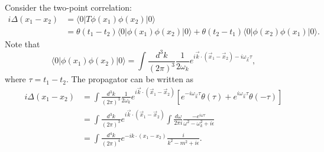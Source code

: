 Consider the two-point correlation:
\begin{equation*}
\begin{aligned}
	i\Delta(x_1-x_2) &= \langle 0|T \phi(x_1) \phi(x_2) |0\rangle \\
	&= \theta(t_1-t_2) \langle 0|\phi(x_1) \phi(x_2) |0\rangle 
	+ \theta(t_2-t_1) \langle 0|\phi(x_2) \phi(x_1) |0\rangle.
\end{aligned}
\end{equation*}
Note that
\begin{equation*}
	\langle 0|\phi(x_1) \phi(x_2) |0\rangle
	= \int\frac{d^{3} k}{(2\pi)^{3}}\frac{1}{2\omega_k} e^{i\vec k\cdot (\vec x_1-\vec x_2)-i\omega_{\vec k}\tau},
\end{equation*}
where $\tau =t_1-t_2$.
The propagator can be written as
\begin{equation*}
\begin{aligned}
	i\Delta(x_1-x_2) 
	&= \int\frac{d^{3} k}{(2\pi)^{3}}\frac{1}{2\omega_k} e^{i\vec k\cdot (\vec x_1-\vec x_2)}\left[e^{-i\omega_{\vec k}\tau}\theta(\tau)+e^{i\omega_{\vec k}\tau}\theta(-\tau)\right] \\
	&= \int\frac{d^{3} k}{(2\pi)^{3}} e^{i\vec k\cdot (\vec x_1-\vec x_2)}\int \frac{d\omega}{2\pi i}\frac{-e^{i\omega\tau}}{\omega^2-\omega_k^2+i\epsilon} \\
	&= \int\frac{d^{4} k}{(2\pi)^{4}} e^{-i k\cdot (x_1-x_2)}\frac{i}{k^2-m^2+i\epsilon}.
\end{aligned}
\end{equation*}



